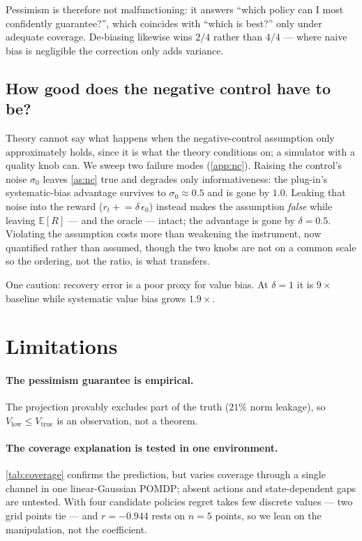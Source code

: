 \documentclass{article}
\theoremstyle{plain}
\theoremstyle{definition}
\begin{document}
Pessimism is therefore not malfunctioning: it answers ``which policy can I most
confidently guarantee?'', which coincides with ``which is best?'' only under
adequate coverage. De-biasing likewise wins $2/4$ rather than $4/4$ --- where
naive bias is negligible the correction only adds variance.

\subsection{How good does the negative control have to be?}
\label{sec:exp-nc}

Theory cannot say what happens when the negative-control assumption only
approximately holds, since it is what the theory conditions on; a simulator with a
quality knob can. We sweep two failure modes (\cref{app:nc}). Raising the
control's noise $\sigma_0$ leaves \cref{as:nc} true and degrades only
informativeness: the plug-in's systematic-bias advantage survives to
$\sigma_0\approx0.5$ and is gone by $1.0$. Leaking that noise into the reward
($r_t \mathrel{+}= \delta\,\epsilon_0$) instead makes the assumption \emph{false}
while leaving $\mathbb{E}[R]$ --- and the oracle --- intact; the advantage is gone
by $\delta=0.5$. Violating the assumption costs more than weakening the
instrument, now quantified rather than assumed, though the two knobs are not on a
common scale so the ordering, not the ratio, is what transfers.

One caution: recovery error is a poor proxy for value bias. At $\delta{=}1$ it is
$9\times$ baseline while systematic value bias grows $1.9\times$.

\section{Limitations}
\label{sec:limits}

\paragraph{The pessimism guarantee is empirical.} The projection provably
excludes part of the truth ($21\%$ norm leakage), so
$V_{\mathrm{low}} \le V_{\mathrm{true}}$ is an observation, not a theorem.

\paragraph{The coverage explanation is tested in one environment.}
\cref{tab:coverage} confirms the prediction, but varies coverage through a single
channel in one linear-Gaussian POMDP; absent actions and state-dependent gaps are
untested. With four candidate policies regret takes few discrete values --- two
grid points tie --- and $r=-0.944$ rests on $n{=}5$ points, so we lean on the
manipulation, not the coefficient.
\end{document}
